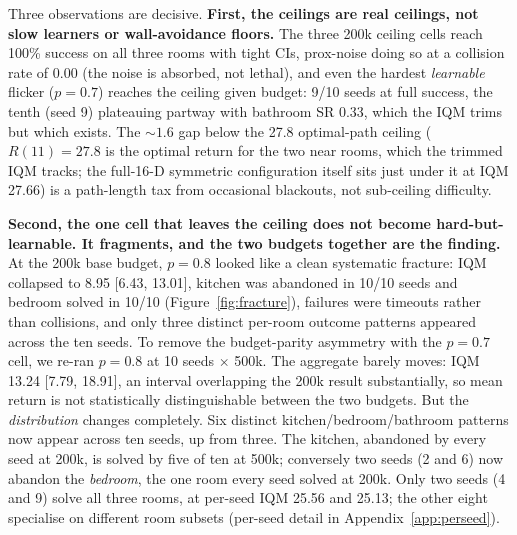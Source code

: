 \documentclass[10pt]{article}
\begin{document}
Three observations are decisive. \textbf{First, the ceilings are real ceilings, not slow
learners or wall-avoidance floors.} The three 200k ceiling cells reach 100\% success on all
three rooms with tight CIs, prox-noise doing so at a collision rate of 0.00 (the noise is
absorbed, not lethal), and even the hardest \emph{learnable} flicker ($p=0.7$) reaches the
ceiling given budget: 9/10 seeds at full success, the tenth (seed 9) plateauing partway with
bathroom SR 0.33, which the IQM trims but which exists. The ${\sim}1.6$ gap below the 27.8
optimal-path ceiling ($R(11)=27.8$ is the optimal return for the two near rooms, which the
trimmed IQM tracks; the full-16-D symmetric configuration itself sits just under it at IQM
27.66) is a path-length tax from occasional blackouts, not sub-ceiling difficulty.

\textbf{Second, the one cell that leaves the ceiling does not become hard-but-learnable. It
fragments, and the two budgets together are the finding.} At the 200k base budget, $p=0.8$
looked like a clean systematic fracture: IQM collapsed to 8.95 [6.43, 13.01], kitchen was
abandoned in 10/10 seeds and bedroom solved in 10/10 (Figure~\ref{fig:fracture}), failures
were timeouts rather than collisions, and only three distinct per-room outcome patterns
appeared across the ten seeds. To remove the budget-parity asymmetry with the $p=0.7$ cell,
we re-ran $p=0.8$ at 10 seeds $\times$ 500k. The aggregate barely moves: IQM 13.24 [7.79,
18.91], an interval overlapping the 200k result substantially, so mean return is not
statistically distinguishable between the two budgets. But the \emph{distribution} changes
completely. Six distinct kitchen/bedroom/bathroom patterns now appear across ten seeds, up
from three. The kitchen, abandoned by every seed at 200k, is solved by five of ten at 500k;
conversely two seeds (2 and 6) now abandon the \emph{bedroom}, the one room every seed
solved at 200k. Only two seeds (4 and 9) solve all three rooms, at per-seed IQM 25.56 and
25.13; the other eight specialise on different room subsets (per-seed detail in
Appendix~\ref{app:perseed}).
\end{document}
